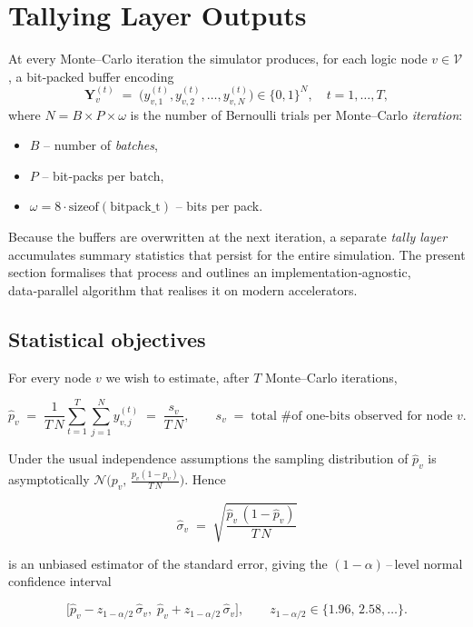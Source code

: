 \section{Tallying Layer Outputs}
\label{sec:tally_kernel}

At every Monte–Carlo iteration the simulator produces, for each logic node
\(v\in \mathcal{V}\), a bit‑packed buffer encoding
\[
  \mathbf{Y}_v^{(t)}
  \;=\;
  \bigl(y_{v,1}^{(t)}, y_{v,2}^{(t)},\dots, y_{v,N}^{(t)}\bigr)
  \in\{0,1\}^N,
  \quad t = 1,\dots,T,
\]
where \(N\!=\!B\!\times\!P\!\times\!\omega\) is the number of Bernoulli trials
per Monte–Carlo \emph{iteration}:
\begin{itemize}
    \item \(B\) – number of \emph{batches},
    \item \(P\) – bit‑packs per batch,
    \item \(\omega\!=\!8\cdot\mathrm{sizeof}(\text{bitpack\_t})\) – bits per pack.
\end{itemize}
Because the buffers are overwritten at the next iteration, a
separate \emph{tally layer} accumulates summary statistics that persist for the
entire simulation.  The present section formalises that process and outlines
an implementation‑agnostic, data‑parallel algorithm that realises it on modern
accelerators.

\subsection{Statistical objectives}
\label{subsec:tally_objective}

For every node \(v\) we wish to estimate, after \(T\) Monte–Carlo iterations,

\[
  \widehat{p}_v
  \;=\;
  \frac{1}{T\,N}
  \sum_{t=1}^{T}\sum_{j=1}^{N} y_{v,j}^{(t)}
  \;=\;
  \frac{s_v}{T\,N},
  \qquad
  s_v \;=\; \text{total \# of one‑bits observed for node \(v\)}.
\]

Under the usual independence assumptions the sampling distribution of
\(\widehat{p}_v\) is asymptotically
\(\mathcal{N}\!\bigl(p_v,\,
  \tfrac{p_v(1-p_v)}{T\,N}\bigr)\).
Hence

\[
  \widehat{\sigma}_v
  \;=\;
  \sqrt{\frac{\widehat{p}_v\,(1-\widehat{p}_v)}{T\,N}}
\]

is an unbiased estimator of the standard error, giving the
\((1-\alpha)\)\,--\,level normal confidence interval

\[
  \bigl[
    \widehat{p}_v - z_{1-\alpha/2}\,\widehat{\sigma}_v,\;
    \widehat{p}_v + z_{1-\alpha/2}\,\widehat{\sigma}_v
  \bigr],
  \qquad
  z_{1-\alpha/2}\in\{1.96,\,2.58,\dots\}.
\]

